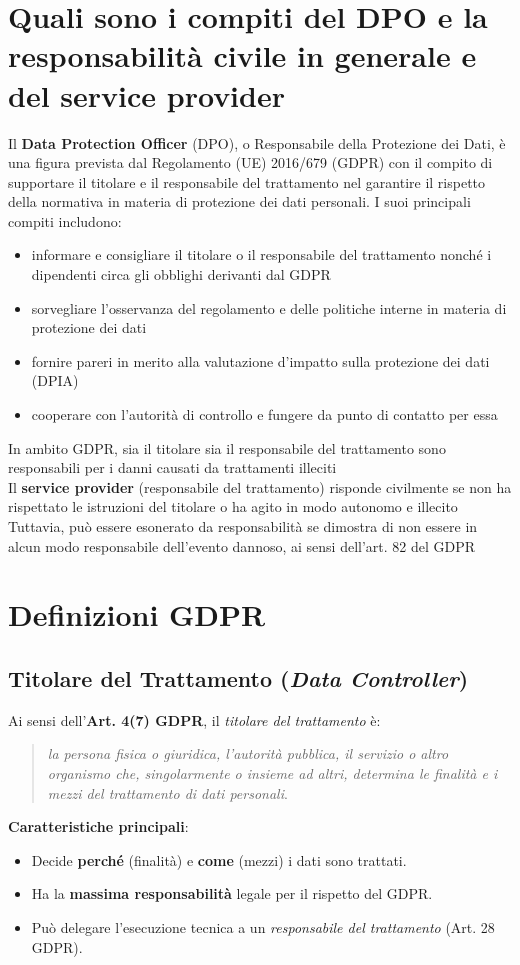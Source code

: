 \documentclass[8pt,oneside,a4paper]{article}
\begin{document}
	\section{Quali sono i compiti del DPO e la responsabilità civile in generale e del service provider}
	Il \textbf{Data Protection Officer} (DPO), o Responsabile della Protezione dei Dati, è una figura prevista dal Regolamento (UE) 2016/679 (GDPR) con il compito di supportare il titolare e il responsabile del trattamento nel garantire il rispetto della normativa in materia di protezione dei dati personali. I suoi principali compiti includono:
	\begin{itemize}
		\item informare e consigliare il titolare o il responsabile del trattamento nonché i dipendenti circa gli obblighi derivanti dal GDPR
		\item sorvegliare l'osservanza del regolamento e delle politiche interne in materia di protezione dei dati
		\item fornire pareri in merito alla valutazione d'impatto sulla protezione dei dati (DPIA)
		\item cooperare con l'autorità di controllo e fungere da punto di contatto per essa
	\end{itemize}
	In ambito GDPR, sia il titolare sia il responsabile del trattamento sono responsabili per i danni causati da trattamenti illeciti\\
	Il \textbf{service provider} (responsabile del trattamento) risponde civilmente se non ha rispettato le istruzioni del titolare o ha agito in modo autonomo e illecito\\
	Tuttavia, può essere esonerato da responsabilità se dimostra di non essere in alcun modo responsabile dell’evento dannoso, ai sensi dell’art. 82 del GDPR
	\section{Definizioni GDPR}
	\subsection{Titolare del Trattamento (\textit{Data Controller})}
	Ai sensi dell'\textbf{Art. 4(7) GDPR}, il \textit{titolare del trattamento} è:
	\begin{quote}
		\textit{la persona fisica o giuridica, l'autorità pubblica, il servizio o altro organismo che, singolarmente o insieme ad altri, determina le finalità e i mezzi del trattamento di dati personali}.
	\end{quote}
	\noindent \textbf{Caratteristiche principali}:
	\begin{itemize}
		\item Decide \textbf{perché} (finalità) e \textbf{come} (mezzi) i dati sono trattati.
		\item Ha la \textbf{massima responsabilità} legale per il rispetto del GDPR.
		\item Può delegare l'esecuzione tecnica a un \textit{responsabile del trattamento} (Art. 28 GDPR).
	\end{itemize}
\end{document}
